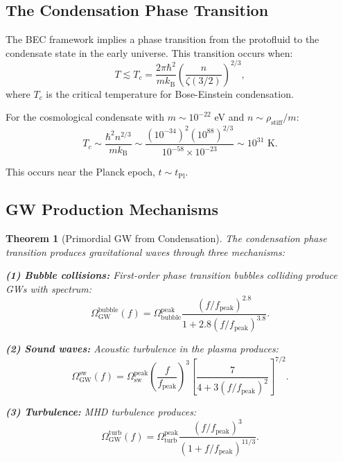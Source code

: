 \documentclass[11pt,a4paper]{article}
\newcommand{\kB}{\ensuremath{k_{\mathrm{B}}}}
\newcommand{\tPl}{\ensuremath{t_{\mathrm{Pl}}}}
\newcommand{\rhostiff}{\ensuremath{\rho_{\mathrm{stiff}}}}
\newtheorem{theorem}{Theorem}[section]
\theoremstyle{definition}
\theoremstyle{remark}
\begin{document}
\subsection{The Condensation Phase Transition}
\label{sec:phase_transition}

The BEC framework implies a phase transition from the protofluid to the condensate state in the early universe. This transition occurs when:
\begin{equation}
T \lesssim T_c = \frac{2\pi\hbar^2}{m\kB}\left(\frac{n}{\zeta(3/2)}\right)^{2/3},
\end{equation}
where $T_c$ is the critical temperature for Bose-Einstein condensation.

For the cosmological condensate with $m \sim 10^{-22}$ eV and $n \sim \rhostiff/m$:
\begin{equation}
T_c \sim \frac{\hbar^2 n^{2/3}}{m\kB} \sim \frac{(10^{-34})^2 (10^{88})^{2/3}}{10^{-58} \times 10^{-23}} \sim 10^{31} \text{ K}.
\end{equation}

This occurs near the Planck epoch, $t \sim \tPl$.

\subsection{GW Production Mechanisms}
\label{sec:production_mechanisms}

\begin{theorem}[Primordial GW from Condensation]
\label{thm:primordial_gw}
The condensation phase transition produces gravitational waves through three mechanisms:

\textbf{(1) Bubble collisions:} First-order phase transition bubbles colliding produce GWs with spectrum:
\begin{equation}
\Omega_{\mathrm{GW}}^{\mathrm{bubble}}(f) = \Omega_{\mathrm{bubble}}^{\mathrm{peak}}\frac{(f/f_{\mathrm{peak}})^{2.8}}{1 + 2.8(f/f_{\mathrm{peak}})^{3.8}}.
\end{equation}

\textbf{(2) Sound waves:} Acoustic turbulence in the plasma produces:
\begin{equation}
\Omega_{\mathrm{GW}}^{\mathrm{sw}}(f) = \Omega_{\mathrm{sw}}^{\mathrm{peak}}\left(\frac{f}{f_{\mathrm{peak}}}\right)^3 \left[\frac{7}{4 + 3(f/f_{\mathrm{peak}})^2}\right]^{7/2}.
\end{equation}

\textbf{(3) Turbulence:} MHD turbulence produces:
\begin{equation}
\Omega_{\mathrm{GW}}^{\mathrm{turb}}(f) = \Omega_{\mathrm{turb}}^{\mathrm{peak}}\frac{(f/f_{\mathrm{peak}})^3}{(1 + f/f_{\mathrm{peak}})^{11/3}}.
\end{equation}
\end{theorem}
\end{document}
